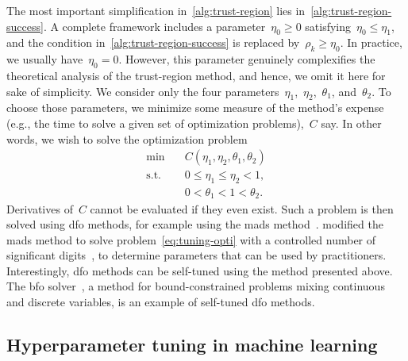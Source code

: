 The most important simplification in~\cref{alg:trust-region} lies in~\cref{alg:trust-region-success}.
A complete framework includes a parameter~$\eta_0 \ge 0$ satisfying~$\eta_0 \le \eta_1$, and the condition in~\cref{alg:trust-region-success} is replaced by~$\rho_k \ge \eta_0$.
In practice, we usually have~$\eta_0 = 0$.
However, this parameter genuinely complexifies the theoretical analysis of the trust-region method, and hence, we omit it here for sake of simplicity.
We consider only the four parameters~$\eta_1$,~$\eta_2$,~$\theta_1$, and~$\theta_2$.
To choose those parameters, we minimize some measure of the method's expense (e.g., the  time to solve a given set of optimization problems),~$C$ say.
In other words, we wish to solve the optimization problem
\begin{subequations}
    \label{eq:tuning-opti}
    \begin{align}
        \min        & \quad C(\eta_1, \eta_2, \theta_1, \theta_2)\\
        \text{s.t.} & \quad 0 \le \eta_1 \le \eta_2 < 1,\\
                    & \quad 0 < \theta_1 < 1 < \theta_2.
    \end{align}
\end{subequations}
Derivatives of~$C$ cannot be evaluated if they even exist.
Such a problem is then solved using \gls{dfo} methods, for example using the \gls{mads} method~\cite{Audet_Orban_2006}.
 modified the \gls{mads} method to solve problem~\cref{eq:tuning-opti} with a controlled number of significant digits~\cite{Audet_Digabel_Tribes_2019}, to determine parameters that can be used by practitioners.
Interestingly, \gls{dfo} methods can be self-tuned using the method presented above.
The \gls{bfo} solver~\cite{Porcelli_Toint_2017}, a method for bound-constrained problems mixing continuous and discrete variables, is an example of self-tuned \gls{dfo} methods.

\subsection{Hyperparameter tuning in machine learning}
\label{subsec:machine-learning}

